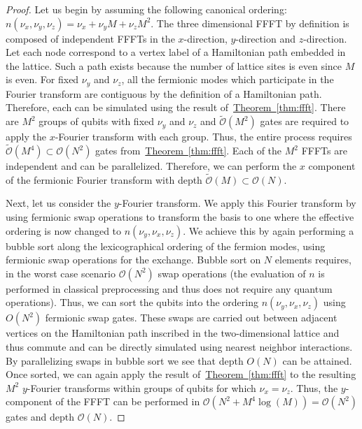 \documentclass[superscriptaddress,aps,pra,nofootinbib,notitlepage,10pt,longbibliography]{revtex4-1}
\newcommand{\thm}[1]{\hyperref[thm:#1]{Theorem~\ref*{thm:#1}}}
\begin{document}
\begin{proof}
Let us begin by assuming the following canonical ordering: $n(\nu_x,\nu_y,\nu_z) = \nu_x +\nu_y M+\nu_z M^2$.  The three dimensional {\rm FFFT} by definition is composed of independent FFFTs in the $x$-direction, $y$-direction and $z$-direction.  Let each node correspond to a vertex label of a Hamiltonian path embedded in the lattice. Such a path exists because the number of lattice sites is even since $M$ is even. For fixed $\nu_y$ and $\nu_z$, all the fermionic modes which participate in the Fourier transform are contiguous by the definition of a Hamiltonian path. Therefore, each can be simulated using the result of~\thm{ffft}. There are $M^2$ groups of qubits with fixed $\nu_y$ and $\nu_z$ and $\widetilde{\mathcal{O}}(M^{2})$ gates are required to apply the $x$-Fourier transform with each group. Thus, the entire process requires $\widetilde{\mathcal{O}}(M^4)\subset \mathcal{O}(N^2)$ gates from~\thm{ffft}. Each of the $M^2$ FFFTs are independent and can be parallelized. Therefore, we can perform the $x$ component of the fermionic Fourier transform with depth $\widetilde{\mathcal{O}}(M)\subset {\mathcal{O}}(N)$.

Next, let us consider the $y$-Fourier transform.  We apply this Fourier transform by using fermionic swap operations to transform the basis to one where the effective ordering is now changed to $n(\nu_y,\nu_x,\nu_z)$. We achieve this by again performing a bubble sort along the lexicographical ordering of the fermion modes, using fermionic swap operations for the exchange. Bubble sort on $N$ elements requires, in the worst case scenario $\mathcal{O}(N^2)$ swap operations (the evaluation of $n$ is performed in classical preprocessing and thus does not require any quantum operations). Thus, we can sort the qubits into the ordering $n(\nu_y,\nu_x,\nu_z)$ using $O(N^2)$ fermionic swap gates. These swaps are carried out between adjacent vertices on the Hamiltonian path inscribed in the two-dimensional lattice and thus commute and can be directly simulated using nearest neighbor interactions. By parallelizing swaps in bubble sort we see that depth $O(N)$ can be attained. Once sorted, we can again apply the result of~\thm{ffft} to the resulting $M^2$ $y$-Fourier transforms within groups of qubits for which $\nu_x = \nu_z$. Thus, the $y$-component of the {\rm FFFT} can be performed in $\mathcal{O}(N^2 + M^4\log(M)) = \mathcal{O}(N^2)$ gates and depth $\mathcal{O}(N)$.


\end{proof}
\end{document}
